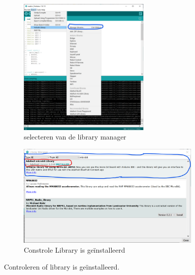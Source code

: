 \begin{figure}[h!]
	 		\centering
	  \begin{center} 	
		\begin{subfigure}[b]{0.45\textwidth}
     \includegraphics[width=0.7\textwidth]{figuren/arduinoManLib}
    \caption{selecteren van de library manager }
     \label{fig:ardLibMan}
   \end{subfigure}
\begin{subfigure}[b]{0.54\textwidth}
	     \includegraphics[width=0.98\textwidth]{figuren/arduinoManLibIns}
	\caption{Constrole Library is geïnstalleerd }
	\label{fig:ardLibCon}
\end{subfigure}
\captionsetup{justification=centering}
\caption{Controleren of library is geïnstalleerd. }
\label{fig:ardinopr1}
\end{center}

\end{figure}

